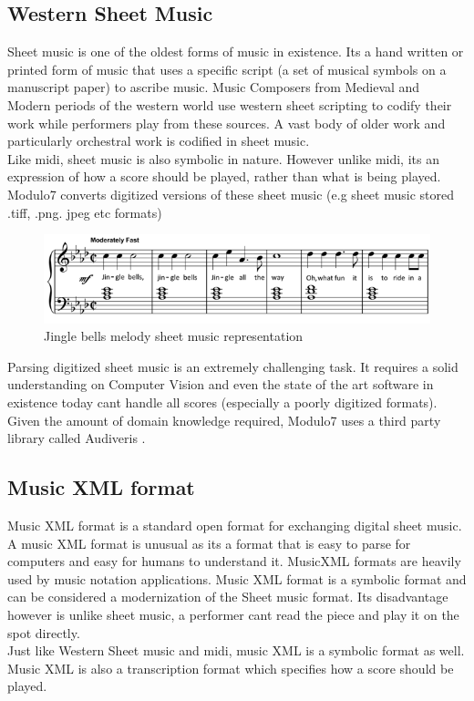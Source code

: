 \subsection{Western Sheet Music}
\noindent Sheet music is one of the oldest forms of music in existence. Its a hand written or printed form of music that uses a specific script (a set of musical symbols on a manuscript paper) to ascribe music. Music Composers from Medieval and Modern periods of the western world use western sheet scripting to codify their work while performers play from these sources. A vast body of older work and particularly orchestral work is codified in sheet music. \\

\noindent Like midi, sheet music is also symbolic in nature. However unlike midi, its an expression of how a score should be played, rather than what is being played.  Modulo7 converts digitized versions of these sheet music (e.g sheet music stored .tiff, .png. jpeg etc formats)\\

\begin{figure}
\centering
\includegraphics[width=\textwidth]{jingle-bells-sheet-music-piano.png}
\makeatletter
\let\@currsize\normalsize
\caption{Jingle bells melody sheet music representation	}
\label{fig:sheet music example}
\end{figure}

\noindent Parsing digitized sheet music is an extremely challenging task. It requires a solid understanding on Computer Vision and even the state of the art software in existence today cant handle all scores (especially a poorly digitized formats). Given the amount of domain knowledge required, Modulo7 uses a third party library called Audiveris . 

\subsection{Music XML format}
\noindent Music XML format is a standard open format for exchanging digital sheet music. A music XML format is unusual as its a format that is easy to parse for computers and easy for humans to understand it. MusicXML formats are heavily used by music notation applications. Music XML format is a symbolic format and can be considered a modernization of the Sheet music format. Its disadvantage however is unlike sheet music, a performer cant read the piece and play it on the spot directly. \\
Just like Western Sheet music and midi, music XML is a symbolic format as well. Music XML is also a transcription format which specifies how a score should be played. 

